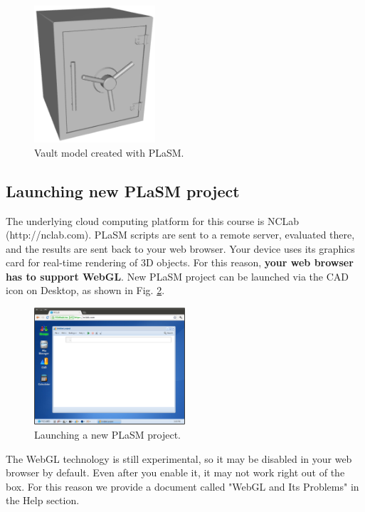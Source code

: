 \documentclass{article}
\begin{document}
\begin{figure}[!ht]
\begin{center}
\includegraphics[width=0.4\textwidth]{img/vault.png}
\end{center}
\vspace{-4mm}
\caption{Vault model created with PLaSM.}
\label{fig:vault0}
\end{figure}


\subsection{Launching new PLaSM project}

The underlying cloud computing platform for this course is NCLab 
(http://nclab.com).
PLaSM scripts are sent to a remote server, evaluated there, 
and the results are sent back to your web browser. Your device uses
its graphics card for real-time rendering of 3D objects. For this 
reason, {\bf your web browser has to support WebGL}. 
New PLaSM project can be launched via the CAD icon on Desktop, as shown 
in Fig. \ref{fig:python}.
\newpage

\begin{figure}[!ht]
\begin{center}
\includegraphics[width=0.5\textwidth]{img/python.png}
\end{center}
\vspace{-2mm}
\caption{Launching a new PLaSM project.}
\label{fig:python}
\end{figure}
\noindent
The WebGL technology is still experimental, so it may be disabled 
in your web browser by default. Even after you enable it, it may not work 
right out of the box. For this reason we provide a document called 
"WebGL and Its Problems" in the Help section.
\end{document}
